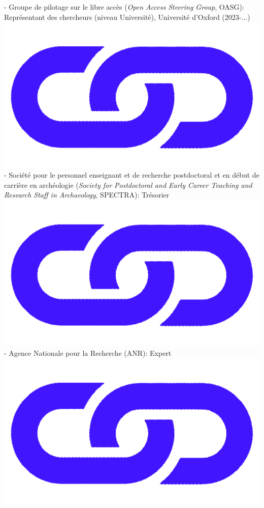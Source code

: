 \documentclass{article}
\begin{document}
- Groupe de pilotage sur le libre accès (\textit{Open Access Steering Group}, OASG): Représentant des chercheurs (niveau Université), Université d'Oxford (2023-...) \href{https://researchsupport.admin.ox.ac.uk/oasg}{\includegraphics[scale=0.02]{link_darkblue.png}}\\ 
- Société pour le personnel enseignant et de recherche postdoctoral et en début de carrière en archéologie (\textit{Society for Postdoctoral and Early Career Teaching and Research Staff in Archaeology}, SPECTRA): Trésorier \href{https://spectra.arch.ox.ac.uk/}{\includegraphics[scale=0.02]{link_darkblue.png}}\\
- Agence Nationale pour la Recherche (ANR): Expert \href{https://iris.anr.fr/}{\includegraphics[scale=0.02]{link_darkblue.png}}\\
\end{document}
